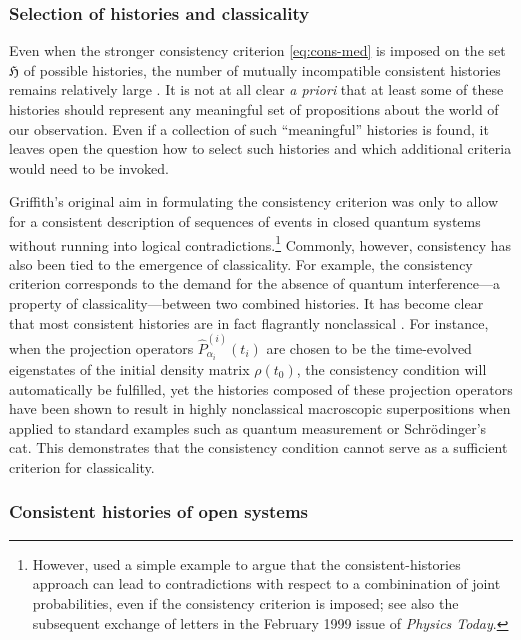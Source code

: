\documentclass[twocolumn,rmp,aps,amsmath,amsfonts,noshowkeys,noshowpacs]{revtex4}
\begin{document}
\subsubsection{Selection of histories and classicality}

Even when the stronger consistency criterion \eqref{eq:cons-med} is
imposed on the set $\mathfrak{H}$ of possible histories, the number of
mutually incompatible consistent histories remains relatively large
\citep{Espagnat:1989:fl,Dowker:1996:ch}. It is not at all clear
\emph{a priori} that at least some of these histories should represent
any meaningful set of propositions about the world of our observation.
Even if a collection of such ``meaningful'' histories is found, it
leaves open the question how to select such histories and which
additional criteria would need to be invoked.

Griffith's \citeyearpar{Griffiths:1984:tr} original aim in formulating
the consistency criterion was only to allow for a consistent
description of sequences of events in closed quantum systems without
running into logical contradictions.\footnote{However,
  \citet{Goldstein:1998:yu} used a simple example to argue that the
  consistent-histories approach can lead to contradictions with
  respect to a combinination of joint probabilities, even if the
  consistency criterion is imposed; see also the subsequent exchange
  of letters in the February 1999 issue of {\em Physics Today}.}
Commonly, however, consistency has also been tied to the emergence of
classicality. For example, the consistency criterion corresponds to
the demand for the absence of quantum interference---a property of
classicality---between two combined histories.  It has become clear
that most consistent histories are in fact flagrantly nonclassical
\citep{GellMann:1990:uz,GellMann:1991:pp,Zurek:1993:pu,Paz:1993:ww,%
  Albrecht:1993:pq,Dowker:1995:pa,Dowker:1996:ch}.  For instance, when
the projection operators $\widehat{P}^{(i)}_{\alpha_i}(t_i)$ are
chosen to be the time-evolved eigenstates of the initial density
matrix $\rho(t_0)$, the consistency condition will automatically be
fulfilled, yet the histories composed of these projection operators
have been shown to result in highly nonclassical macroscopic
superpositions when applied to standard examples such as quantum
measurement or Schr\"odinger's cat. This demonstrates that the
consistency condition cannot serve as a sufficient criterion for
classicality.


\subsubsection{Consistent histories of open systems}
\end{document}

